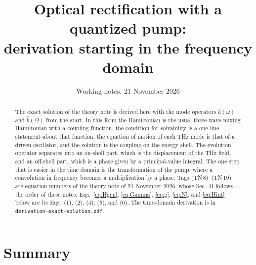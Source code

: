 \documentclass[aps,pra,onecolumn,notitlepage,11pt,amsmath,amssymb,nofootinbib]{revtex4-2}
\begin{document}
\title{Optical rectification with a quantized pump:\\
derivation starting in the frequency domain}
\author{Working notes, 21 November 2026}
\noaffiliation

\begin{abstract}
The exact solution of the theory note is derived here with the mode
operators $\hat a(\omega)$ and $\hat b(\Omega)$ from the start. In this form
the Hamiltonian is the usual three-wave-mixing Hamiltonian with a coupling
function, the condition for solvability is a one-line statement about that
function, the equation of motion of each THz mode is that of a driven
oscillator, and the solution is the coupling on the energy shell. The
evolution operator separates into an on-shell part, which is the
displacement of the THz field, and an off-shell part, which is a phase given
by a principal-value integral. The one step that is easier in the time
domain is the transformation of the pump, where a convolution in frequency
becomes a multiplication by a phase. Tags (TN\,8)--(TN\,19) are equation
numbers of the theory note of 21 November 2026, whose Sec.~II follows the
order of these notes; Eqs.~\eqref{eq:Hgen}, \eqref{eq:Gamma}, \eqref{eq:g},
\eqref{eq:N}, and \eqref{eq:Hint} below are its Eqs.~(1), (2), (4), (5), and
(6). The time-domain derivation is in
\texttt{derivation-exact-solution.pdf}.
\end{abstract}

\maketitle

\section{Summary}
\end{document}
